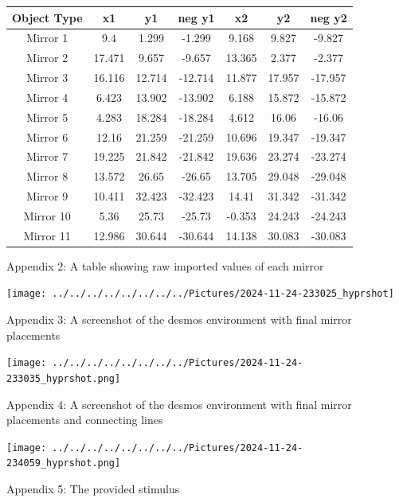 \documentclass[11pt, letterpaper]{article}
\begin{document}
\begin{center}

\begin{tabular}{|c|c|c|c|c|c|c|}
	\hline
	Object Type & x1 & y1 & neg y1 & x2 & y2 & neg y2 \\
	\hline
	Mirror 1 & 9.4 & 1.299 & -1.299 & 9.168 & 9.827 & -9.827 \\
	\hline
	Mirror 2 & 17.471 & 9.657 & -9.657 & 13.365 & 2.377 & -2.377 \\
	\hline
	Mirror 3 & 16.116 & 12.714 & -12.714 & 11.877 & 17.957 & -17.957 \\
	\hline
	Mirror 4 & 6.423 & 13.902 & -13.902 & 6.188 & 15.872 & -15.872 \\
	\hline
	Mirror 5 & 4.283 & 18.284 & -18.284 & 4.612 & 16.06 & -16.06 \\
	\hline
	Mirror 6 & 12.16 & 21.259 & -21.259 & 10.696 & 19.347 & -19.347 \\
	\hline
	Mirror 7 & 19.225 & 21.842 & -21.842 & 19.636 & 23.274 & -23.274 \\
	\hline
	Mirror 8 & 13.572 & 26.65 & -26.65 & 13.705 & 29.048 & -29.048 \\
	\hline
	Mirror 9 & 10.411 & 32.423 & -32.423 & 14.41 & 31.342 & -31.342 \\
	\hline
	Mirror 10 & 5.36 & 25.73 & -25.73 & -0.353 & 24.243 & -24.243 \\
	\hline
	Mirror 11 & 12.986 & 30.644 & -30.644 & 14.138 & 30.083 & -30.083 \\
	\hline
\end{tabular}
\end{center}
\begin{center}
{Appendix 2: A table showing raw imported values of each mirror}
\end{center}




\begin{center}
\texttt{[image: ../../../../../../../../Pictures/2024-11-24-233025\_hyprshot]}

\end{center}
\begin{center}
{Appendix 3: A screenshot of the desmos environment with final mirror placements}
\end{center}

\begin{center}
	\texttt{[image: ../../../../../../../../Pictures/2024-11-24-233035\_hyprshot.png]}
	
\end{center}
\begin{center}
{Appendix 4: A screenshot of the desmos environment with final mirror placements and connecting lines}
\end{center}

\begin{center}
	\texttt{[image: ../../../../../../../../Pictures/2024-11-24-234059\_hyprshot.png]}
	
\end{center}
\begin{center}
{Appendix 5: The provided stimulus}
\end{center}

 
 
\end{document}
